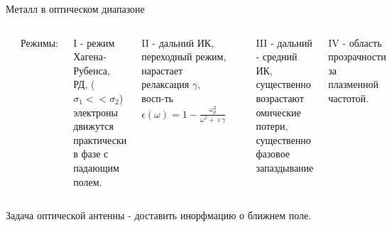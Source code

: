 \documentclass[9pt, compress, xcolor=table]{beamer}
\begin{document}
\begin{frame}{Металл в оптическом диапазоне}

\begin{columns}[c]
\column{6cm}
\begin{center}
\includegraphics[width=0.7\textwidth]{optant56}
\end{center}
\textcolor{red!50!black}{Режимы:}

\textcolor{red!50!black}{I} - режим Хагена-Рубенса, РД, ($\sigma_1<<\sigma_2$) электроны движутся практически в фазе с падающим полем.

\textcolor{red!50!black}{II} - дальний ИК, переходный режим, нарастает релаксация $\gamma$, восп-ть $\epsilon(\omega) = 1-\frac{\omega_p^2}{\omega^2+\imath \gamma}$

\column{6.2cm}
\begin{center}
\includegraphics[width=0.7\textwidth]{optant57}
\end{center}

\textcolor{red!50!black}{III} - дальний - средний ИК, существенно возрастают омические потери, существенно фазовое запаздывание

\textcolor{red!50!black}{IV} - область прозрачности за плазменной частотой.

\end{columns}

$\boxed{\text{Задача оптической антенны - доставить инорфмацию о ближнем поле.}}$

\end{frame}
\end{document}
